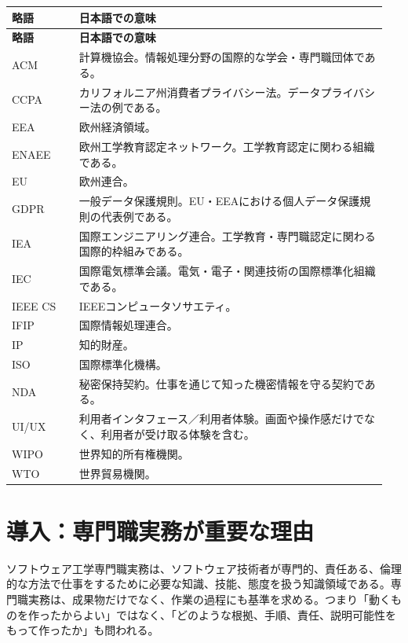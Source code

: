\documentclass[uplatex,dvipdfmx,a4paper,11pt]{jsarticle}
\begin{document}

\begin{center}
\small
\begin{longtable}{p{0.17\linewidth}p{0.78\linewidth}}
\toprule
\textbf{略語} & \textbf{日本語での意味} \\
\midrule
\endfirsthead
\toprule
\textbf{略語} & \textbf{日本語での意味} \\
\midrule
\endhead
ACM & 計算機協会。情報処理分野の国際的な学会・専門職団体である。 \\
\midrule
CCPA & カリフォルニア州消費者プライバシー法。データプライバシー法の例である。 \\
\midrule
EEA & 欧州経済領域。 \\
\midrule
ENAEE & 欧州工学教育認定ネットワーク。工学教育認定に関わる組織である。 \\
\midrule
EU & 欧州連合。 \\
\midrule
GDPR & 一般データ保護規則。EU・EEAにおける個人データ保護規則の代表例である。 \\
\midrule
IEA & 国際エンジニアリング連合。工学教育・専門職認定に関わる国際的枠組みである。 \\
\midrule
IEC & 国際電気標準会議。電気・電子・関連技術の国際標準化組織である。 \\
\midrule
IEEE CS & IEEEコンピュータソサエティ。 \\
\midrule
IFIP & 国際情報処理連合。 \\
\midrule
IP & 知的財産。 \\
\midrule
ISO & 国際標準化機構。 \\
\midrule
NDA & 秘密保持契約。仕事を通じて知った機密情報を守る契約である。 \\
\midrule
UI/UX & 利用者インタフェース／利用者体験。画面や操作感だけでなく、利用者が受け取る体験を含む。 \\
\midrule
WIPO & 世界知的所有権機関。 \\
\midrule
WTO & 世界貿易機関。 \\
\midrule
\bottomrule
\end{longtable}
\normalsize
\end{center}

\section*{導入：専門職実務が重要な理由}


ソフトウェア工学専門職実務は、ソフトウェア技術者が専門的、責任ある、倫理的な方法で仕事をするために必要な知識、技能、態度を扱う知識領域である。専門職実務は、成果物だけでなく、作業の過程にも基準を求める。つまり「動くものを作ったからよい」ではなく、「どのような根拠、手順、責任、説明可能性をもって作ったか」も問われる。
\end{document}
